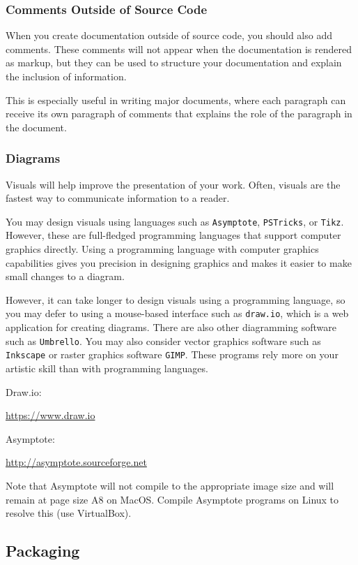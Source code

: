\documentclass{article}
\begin{document}
\subsubsection{Comments Outside of Source Code}

When you create documentation outside of source code, 
you should also add comments.
These comments will not appear when the documentation
is rendered as markup, but they can be used to structure
your documentation and explain the inclusion of information.

This is especially useful in writing major documents, where each
paragraph can receive its own paragraph of comments
that explains the role of the paragraph in the document.


\subsubsection{Diagrams}

Visuals will help improve the presentation of your work.
Often, visuals are the fastest way to communicate information
to a reader.

You may design visuals using languages such as \texttt{Asymptote},
\texttt{PSTricks}, or \texttt{Tikz}. However, these are full-fledged programming
languages that support computer graphics directly.
Using a programming language with computer graphics capabilities
gives you precision in designing graphics and makes it easier
to make small changes to a diagram.

However, it can take longer to design visuals using a programming
language, so you may defer to using a mouse-based interface 
such as \texttt{draw.io}, which is a web application
for creating diagrams. There are also other diagramming software
such as \texttt{Umbrello}. You may also consider vector graphics
software such as \texttt{Inkscape} or raster graphics software 
\texttt{GIMP}. These programs rely more on your artistic skill
than with programming languages.

Draw.io:

\url{https://www.draw.io}

Asymptote:

\url{http://asymptote.sourceforge.net}

Note that Asymptote will not compile to the appropriate
image size and will remain at page size A8 on MacOS.
Compile Asymptote programs on Linux to resolve this 
(use VirtualBox). 

\subsection{Packaging}
\end{document}
